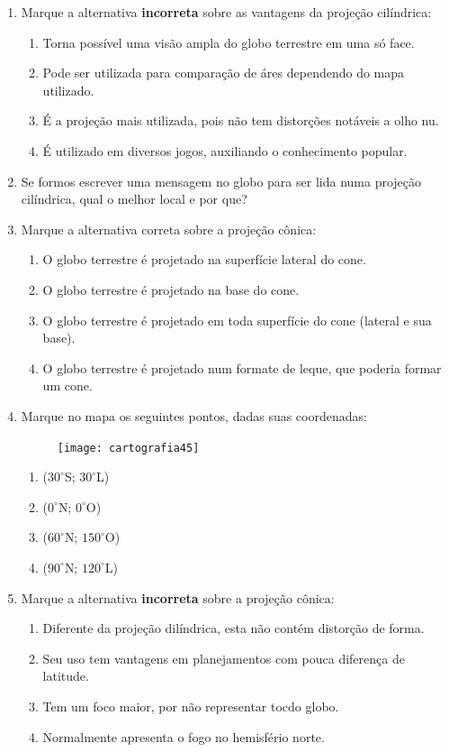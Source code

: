 \begin{enumerate}
\item Marque a alternativa \textbf{incorreta} sobre as vantagens da projeção cilíndrica:
\begin{enumerate}
\item Torna possível uma visão ampla do globo terrestre em uma só face.
\item Pode ser utilizada para comparação de áres dependendo do mapa utilizado.
\item É a projeção mais utilizada, pois não tem distorções notáveis a olho nu.
\item É utilizado em diversos jogos, auxiliando o conhecimento popular.
\end{enumerate}

\item Se formos escrever uma mensagem no globo para ser lida numa projeção cilíndrica, qual o melhor local e por que?

\item Marque a alternativa correta sobre a projeção cônica:
\begin{enumerate}
\item O globo terrestre é projetado na superfície lateral do cone.
\item O globo terrestre é projetado na base do cone.
\item O globo terrestre é projetado em toda superfície do cone (lateral e sua base).
\item O globo terrestre é projetado num formate de leque, que poderia formar um cone.
\end{enumerate}

\item Marque no mapa os seguintes pontos, dadas suas coordenadas:

\begin{figure}[H]
\centering
\texttt{[image: cartografia45]}

\end{figure}

\begin{enumerate}
\item ($30^{\circ}$S; $30^{\circ}$L)
\item ($0^{\circ}$N; $0^{\circ}$O)
\item ($60^{\circ}$N; $150^{\circ}$O)
\item ($90^{\circ}$N; $120^{\circ}$L)
\end{enumerate}

\item Marque a alternativa \textbf{incorreta} sobre a projeção cônica:
\begin{enumerate}
\item Diferente da projeção dilíndrica, esta não contém distorção de forma.
\item Seu uso tem vantagens em planejamentos com pouca diferença de latitude.
\item Tem um foco maior, por não representar tocdo globo.
\item Normalmente apresenta o fogo no hemisfério norte.
\end{enumerate}


\end{enumerate}

